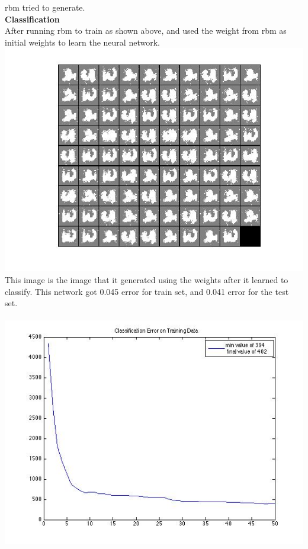 \documentclass{article}
\begin{document}
rbm tried to generate.\\
{\bf Classification}\\
After running rbm to train as shown above, and used the weight from rbm as
initial weights to learn the neural network.\\
\includegraphics[scale=0.4]{rbm_h400_l0.005_m0.8/gen_classify.jpg}\\
This image is the image that it generated using the weights after it learned to
classify. This network got 0.045 error for train set, and 0.041 error for the test
set.\\\\
\includegraphics[scale=0.4]{rbm_h400_l0.005_m0.8/classErrTrain.jpg}
\end{document}
